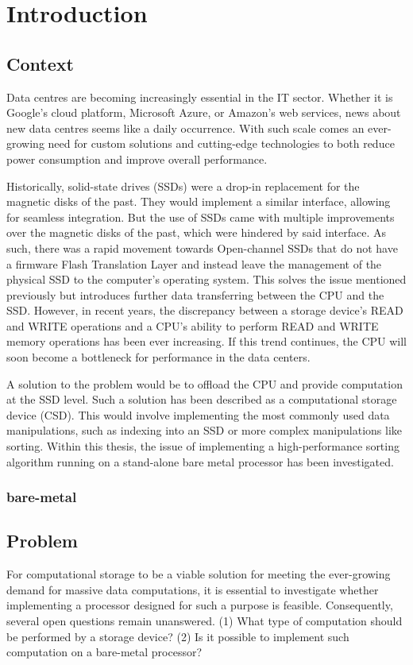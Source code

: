 \section{Introduction}
\subsection{Context}\label{sec:context}
Data centres are becoming increasingly essential in the IT sector. Whether it is
Google's cloud platform, Microsoft Azure, or Amazon's web services, news about
new data centres seems like a daily occurrence. With such scale comes an
ever-growing need for custom solutions and cutting-edge technologies to both
reduce power consumption and improve overall performance.

Historically, solid-state drives (SSDs) were a drop-in replacement for the
magnetic disks of the past. They would implement a similar interface, allowing
for seamless integration. But the use of SSDs came with multiple improvements
over the magnetic disks of the past, which were hindered by said interface. As
such, there was a rapid movement towards Open-channel SSDs that do not have a
firmware Flash Translation Layer and instead leave the management of the
physical SSD to the computer's operating system. This solves the issue mentioned
previously but introduces further data transferring between the CPU and the SSD.
However, in recent years, the discrepancy between a storage device's READ and
WRITE operations and a CPU's ability to perform READ and WRITE memory operations
has been ever increasing. If this trend continues, the CPU will soon become a
bottleneck for performance in the data centers.

A solution to the problem would be to offload the CPU and provide computation at
the SSD level. Such a solution has been described as a computational storage
device (CSD). This would involve implementing the most commonly used data
manipulations, such as indexing into an SSD or more complex manipulations like
sorting. Within this thesis, the issue of implementing a high-performance
sorting algorithm running on a stand-alone bare metal processor has been
investigated.

\subsubsection{bare-metal}\label{sec:bare-metal}


\subsection{Problem}
For computational storage to be a viable solution for meeting the ever-growing
demand for massive data computations, it is essential to investigate whether
implementing a processor designed for such a purpose is feasible. Consequently,
several open questions remain unanswered. (1) What type of computation should be
performed by a storage device? (2) Is it possible to implement such computation
on a bare-metal processor?

